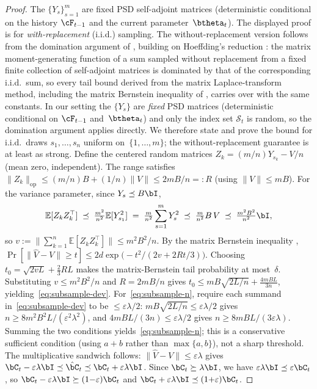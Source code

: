 \begin{proof}
The $\{Y_s\}_{s=1}^m$ are fixed PSD self-adjoint matrices (deterministic
conditional on the history $\cF_{t-1}$ and the current
parameter~$\btheta_t$).
The displayed proof is for \emph{with-replacement} (i.i.d.) sampling.
The without-replacement version follows from the domination argument of
\citet{gross2010note}, building on Hoeffding's reduction
\citep{hoeffding1963probability}: the matrix moment-generating function
of a sum sampled without replacement from a fixed finite collection of
self-adjoint matrices is dominated by that of the corresponding
i.i.d.\ sum, so every tail bound derived from the matrix
Laplace-transform method, including the matrix Bernstein inequality of
\citet[Thm.~6.1.1]{tropp2015introduction}, carries over with the same
constants.
In our setting the $\{Y_s\}$ are \emph{fixed} PSD matrices
(deterministic conditional on $\cF_{t-1}$ and~$\btheta_t$) and only
the index set $\mathcal{S}_t$ is random, so the domination argument
applies directly.
We therefore state and prove the bound for i.i.d.\ draws
$s_1,\dots,s_n$ uniform on~$\{1,\dots,m\}$; the
without-replacement guarantee is at least as strong.
Define the centered random matrices
$Z_k = (m/n)Y_{s_k} - V/n$ (mean zero, independent).
The range satisfies
$\|Z_k\|_{\mathrm{op}} \le (m/n)B + (1/n)\|V\| \le 2mB/n =: R$
(using $\|V\|\le mB$).
For the variance parameter, since $Y_s\preceq B\bI$,
\[
  \mathbb{E}[Z_k Z_k^\top]
  \;\preceq\; \tfrac{m^2}{n^2}\mathbb{E}[Y_{s_1}^2]
  \;=\; \tfrac{m}{n^2}\sum_{s=1}^m Y_s^2
  \;\preceq\; \tfrac{m}{n^2}B\,V
  \;\preceq\; \tfrac{m^2B^2}{n^2}\bI,
\]
so $v :=
\bigl\|\sum_{k=1}^n\mathbb{E}[Z_kZ_k^\top]\bigr\|\le m^2B^2/n$.
By the matrix Bernstein inequality
\citep[Thm.~6.1.1]{tropp2015introduction},
$\Pr[\|\hat V{-}V\| \ge t]
\le 2d\exp\!\bigl(-t^2/(2v + 2Rt/3)\bigr)$.
Choosing
$t_0=\sqrt{2vL}+\tfrac{2}{3}RL$
makes the matrix-Bernstein tail probability at most~$\delta$.  Substituting
$v\le m^2B^2/n$ and $R=2mB/n$ gives
$t_0\le mB\sqrt{2L/n}+\tfrac{4mBL}{3n}$,
yielding~\eqref{eq:subsample-dev}.
For~\eqref{eq:subsample-n}, require each summand
in~\eqref{eq:subsample-dev} to be $\le\varepsilon\lambda/2$:
$mB\sqrt{2L/n}\le\varepsilon\lambda/2$ gives
$n\ge 8m^2B^2L/(\varepsilon^2\lambda^2)$, and
$4mBL/(3n)\le\varepsilon\lambda/2$ gives
$n\ge 8mBL/(3\varepsilon\lambda)$.
Summing the two conditions
yields~\eqref{eq:subsample-n}; this is a conservative sufficient
condition (using $a+b$ rather than $\max\{a,b\}$), not a sharp threshold.
The multiplicative sandwich follows:
$\|\hat V{-}V\|\le\varepsilon\lambda$ gives
$\bC_t - \varepsilon\lambda\bI \preceq \hat\bC_t \preceq
\bC_t + \varepsilon\lambda\bI$.
Since $\bC_t\succeq\lambda\bI$, we have
$\varepsilon\lambda\bI \preceq \varepsilon\bC_t$, so
$\bC_t - \varepsilon\lambda\bI \succeq (1{-}\varepsilon)\bC_t$ and
$\bC_t + \varepsilon\lambda\bI \preceq (1{+}\varepsilon)\bC_t$.
\end{proof}

